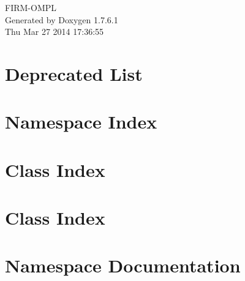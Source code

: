 \documentclass[a4paper]{book}
\begin{document}
\hypersetup{pageanchor=false,citecolor=blue}
\begin{titlepage}
\vspace*{7cm}
\begin{center}
{\Large \-F\-I\-R\-M-\/\-O\-M\-P\-L }\\
\vspace*{1cm}
{\large \-Generated by Doxygen 1.7.6.1}\\
\vspace*{0.5cm}
{\small Thu Mar 27 2014 17:36:55}\\
\end{center}
\end{titlepage}
\clearemptydoublepage
{}
\tableofcontents
\clearemptydoublepage
{}
\hypersetup{pageanchor=true,citecolor=blue}
\chapter{\-Deprecated \-List}
\label{deprecated}
\hypertarget{deprecated}{}

\chapter{\-Namespace \-Index}

\chapter{\-Class \-Index}

\chapter{\-Class \-Index}

\chapter{\-Namespace \-Documentation}

\end{document}
